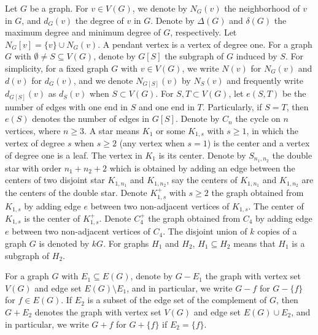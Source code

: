 \documentclass[12pt]{article}
\begin{document}
Let $G$ be a graph.
For $v\in V(G)$, we denote by $N_G(v)$ the neighborhood of $v$ in $G$, and $d_G(v)$ the degree of $v$ in $G$. Denote by $\Delta(G)$ and $\delta(G)$ the maximum degree and minimum degree of $G$, respectively. Let $N_G[v]=\{v\}\cup N_G(v)$.  A pendant vertex is a vertex of degree one.
For a graph $G$ with $\emptyset\ne S\subseteq V(G)$, denote by $G[S]$ the subgraph of $G$ induced by $S$.
For simplicity, for a fixed graph $G$ with $v\in V(G)$, we write $N(v)$ for $N_G(v)$ and $d(v)$ for $d_G(v)$, and we denote $N_{G[S]}(v)$ by $N_S(v)$ and frequently write $d_{G[S]}(v)$ as $d_S(v)$  when $S\subset V(G)$. For $S,T\subset V(G)$, let $e(S,T)$ be the number of edges with one end in $S$ and one end in $T$. Particularly, if $S=T$, then $e(S)$ denotes the number of edges in $G[S]$.
Denote by $C_n$ the cycle on $n$ vertices, where $n\ge 3$.
A star means $K_1$ or some $K_{1,s}$ with $s\ge 1$, in which  the vertex of degree $s$ when $s\ge 2$ (any vertex when $s=1$) is the center and a vertex of degree one is a leaf. The vertex in $K_1$ is its center.
Denote by $S_{n_1,n_2}$ the double star with order $n_1+n_2+2$ which is obtained by adding an edge between the centers of two disjoint star $K_{1,n_1}$ and $K_{1,n_2}$, say the centers of $K_{1,n_1}$ and $K_{1,n_2}$ are the centers of the double star.
Denote $K_{1,s}^+$ with $s\ge 2$ the graph obtained from $K_{1,s}$ by adding edge $e$ between two non-adjacent vertices of $K_{1,s}$. The center of $K_{1,s}$ is the center of $K_{1,s}^+$.
Denote $C_4^+$ the graph obtained from $C_4$ by adding edge $e$ between two non-adjacent vertices of $C_4$.
The disjoint union of $k$ copies of a graph $G$ is denoted by $kG$. For graphs $H_1$ and $H_2$, $H_1\subseteq H_2$ means that $H_1$ is a subgraph of $H_2$.



For a graph $G$ with $E_1\subseteq E(G)$, denote by $G-E_1$ the graph with vertex set $V(G)$ and edge set
$E(G)\setminus E_1$, and in particular, we write $G-f$ for $G-\{f\}$ for $f\in E(G)$. If $E_2$ is a subset of the edge set of the complement of $G$, then $G+E_2$ denotes the graph with vertex set $V(G)$ and edge set $E(G)\cup E_2$, and in particular, we write $G+f$ for $G+\{f\}$ if $E_2=\{f\}$.
\end{document}
